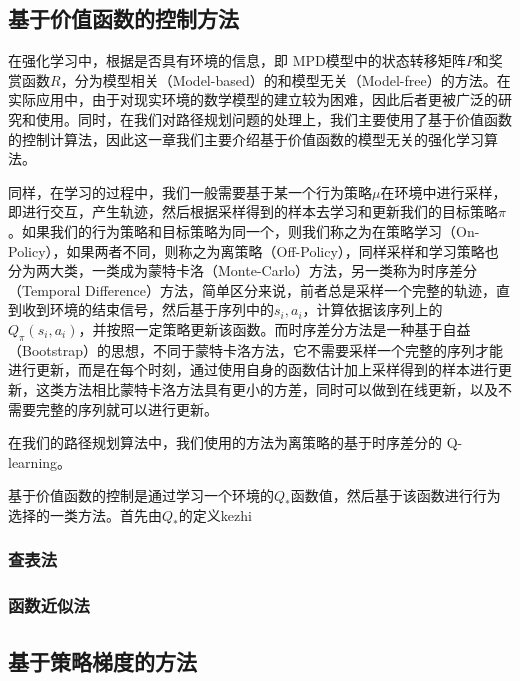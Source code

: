 \documentclass{standalone}
\begin{document}
\subsection{基于价值函数的控制方法}
在强化学习中，根据是否具有环境的信息，即 MPD模型中的状态转移矩阵$P$和奖赏函数$R$，分为模型相关（Model-based）的和模型无关（Model-free）的方法。在实际应用中，由于对现实环境的数学模型的建立较为困难，因此后者更被广泛的研究和使用。同时，在我们对路径规划问题的处理上，我们主要使用了基于价值函数的控制计算法，因此这一章我们主要介绍基于价值函数的模型无关的强化学习算法。\par
同样，在学习的过程中，我们一般需要基于某一个行为策略$\mu$在环境中进行采样，即进行交互，产生轨迹，然后根据采样得到的样本去学习和更新我们的目标策略$\pi$。如果我们的行为策略和目标策略为同一个，则我们称之为在策略学习（On-Policy），如果两者不同，则称之为离策略（Off-Policy），同样采样和学习策略也分为两大类，一类成为蒙特卡洛（Monte-Carlo）方法，另一类称为时序差分（Temporal Difference）方法，简单区分来说，前者总是采样一个完整的轨迹，直到收到环境的结束信号，然后基于序列中的$s_i, a_i$，计算依据该序列上的$Q_{\pi}(s_i, a_i)$，并按照一定策略更新该函数。而时序差分方法是一种基于自益（Bootstrap）的思想，不同于蒙特卡洛方法，它不需要采样一个完整的序列才能进行更新，而是在每个时刻，通过使用自身的函数估计加上采样得到的样本进行更新，这类方法相比蒙特卡洛方法具有更小的方差，同时可以做到在线更新，以及不需要完整的序列就可以进行更新。\par
在我们的路径规划算法中，我们使用的方法为离策略的基于时序差分的 Q-learning。


基于价值函数的控制是通过学习一个环境的$Q_*$函数值，然后基于该函数进行行为选择的一类方法。首先由$Q_*$的定义kezhi
\subsubsection{查表法}
\subsubsection{函数近似法}

\subsection{基于策略梯度的方法}
\end{document}
